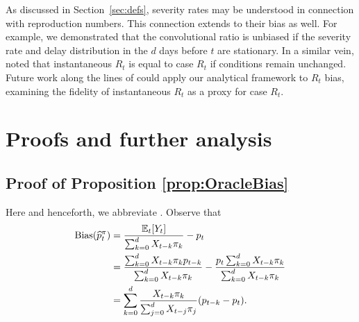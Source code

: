 \documentclass{article}
\renewcommand{\hat}{\widehat} %
\newcommand{\given}{\, \vert \,}
\DeclareMathOperator{\bias}{Bias}
\begin{document}
As discussed in Section~\ref{sec:defs}, severity rates may be understood in connection with reproduction numbers. This connection extends to their bias as well. For example, we  demonstrated that the convolutional ratio is unbiased if the severity rate and delay distribution in the $d$ days before $t$ are stationary. In a similar vein, \citet{fraser2007} noted that instantaneous $R_t$ is equal to case $R_t$ if conditions remain unchanged. 
Future work along the lines of \citet{rt_study} could apply our analytical framework to $R_t$ bias, examining the fidelity of instantaneous $R_t$ as a proxy for case $R_t$. 




\clearpage
\appendix

\section{Proofs and further analysis}
\label{apx:proofs}

\subsection{Proof of Proposition \ref{prop:OracleBias}}
\label{apx:OracleBias}

Here and henceforth, we abbreviate \smash{$\E_t[\cdot] = \E[\cdot \given
  \{X_s\}_{s\leq t}]$}. Observe that
\begin{align*}
\bias(\hat{p}_t^\pi) 
&= \frac{\E_t[Y_t]}{\sum_{k=0}^d X_{t-k}\pi_k} - p_t \\ 
&= \frac{\sum_{k=0}^d X_{t-k}\pi_k p_{t-k}}{\sum_{k=0}^d X_{t-k}\pi_k} - 
\frac{p_t \sum_{k=0}^d X_{t-k}\pi_k}{\sum_{k=0}^d X_{t-k}\pi_k} \\
&= \sum_{k=0}^d \frac{X_{t-k}\pi_k}{\sum_{j=0}^d X_{t-j}\pi_j} (p_{t-k}-p_t).
\end{align*}
\end{document}
